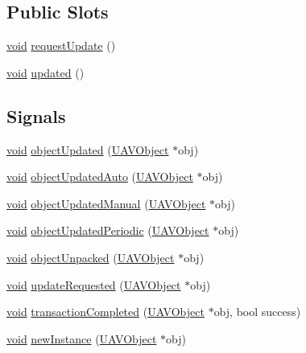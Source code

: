 \subsection*{\-Public \-Slots}
\begin{DoxyCompactItemize}
\item 
\hyperlink{group___u_a_v_objects_plugin_ga444cf2ff3f0ecbe028adce838d373f5c}{void} \hyperlink{group___u_a_v_objects_plugin_ga6018820b37db308fb1ee1b3c3ff4f9a0}{request\-Update} ()
\item 
\hyperlink{group___u_a_v_objects_plugin_ga444cf2ff3f0ecbe028adce838d373f5c}{void} \hyperlink{group___u_a_v_objects_plugin_ga295ff9d6b0c01a6a8809a4cf9eb027cc}{updated} ()
\end{DoxyCompactItemize}
\subsection*{\-Signals}
\begin{DoxyCompactItemize}
\item 
\hyperlink{group___u_a_v_objects_plugin_ga444cf2ff3f0ecbe028adce838d373f5c}{void} \hyperlink{group___u_a_v_objects_plugin_ga9aac3ae5395f63249cd821e0e5be5bf2}{object\-Updated} (\hyperlink{class_u_a_v_object}{\-U\-A\-V\-Object} $\ast$obj)
\item 
\hyperlink{group___u_a_v_objects_plugin_ga444cf2ff3f0ecbe028adce838d373f5c}{void} \hyperlink{group___u_a_v_objects_plugin_ga568cdde04946e82d60a3707fefdd2572}{object\-Updated\-Auto} (\hyperlink{class_u_a_v_object}{\-U\-A\-V\-Object} $\ast$obj)
\item 
\hyperlink{group___u_a_v_objects_plugin_ga444cf2ff3f0ecbe028adce838d373f5c}{void} \hyperlink{group___u_a_v_objects_plugin_ga347d21d00c26e23b58dae5510bdc3a7d}{object\-Updated\-Manual} (\hyperlink{class_u_a_v_object}{\-U\-A\-V\-Object} $\ast$obj)
\item 
\hyperlink{group___u_a_v_objects_plugin_ga444cf2ff3f0ecbe028adce838d373f5c}{void} \hyperlink{group___u_a_v_objects_plugin_ga1ba37e7a5eafe1d5a598b2dfb877d2f0}{object\-Updated\-Periodic} (\hyperlink{class_u_a_v_object}{\-U\-A\-V\-Object} $\ast$obj)
\item 
\hyperlink{group___u_a_v_objects_plugin_ga444cf2ff3f0ecbe028adce838d373f5c}{void} \hyperlink{group___u_a_v_objects_plugin_ga2b9ae613f54e59b358dbf2e31d32d9ad}{object\-Unpacked} (\hyperlink{class_u_a_v_object}{\-U\-A\-V\-Object} $\ast$obj)
\item 
\hyperlink{group___u_a_v_objects_plugin_ga444cf2ff3f0ecbe028adce838d373f5c}{void} \hyperlink{group___u_a_v_objects_plugin_ga13ce31a6262476db602eec857d9b40c1}{update\-Requested} (\hyperlink{class_u_a_v_object}{\-U\-A\-V\-Object} $\ast$obj)
\item 
\hyperlink{group___u_a_v_objects_plugin_ga444cf2ff3f0ecbe028adce838d373f5c}{void} \hyperlink{group___u_a_v_objects_plugin_gafac716c4828b4506f6982f79fc7827c2}{transaction\-Completed} (\hyperlink{class_u_a_v_object}{\-U\-A\-V\-Object} $\ast$obj, bool success)
\item 
\hyperlink{group___u_a_v_objects_plugin_ga444cf2ff3f0ecbe028adce838d373f5c}{void} \hyperlink{group___u_a_v_objects_plugin_gadf709e4ec60d0dfc3cc4a12012c400f3}{new\-Instance} (\hyperlink{class_u_a_v_object}{\-U\-A\-V\-Object} $\ast$obj)
\end{DoxyCompactItemize}
